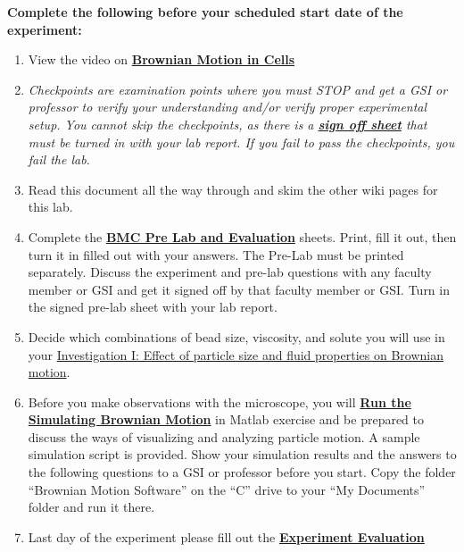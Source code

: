 \documentclass{../lab}
\begin{document}
\textbf{Complete the following before your scheduled start date of the experiment:}

\begin{enumerate}
    \item View the video on \href{http://youtu.be/XJ6YBTL6euc}{\textbf{Brownian Motion in Cells}}

    \item \emph{Checkpoints are examination points where you must STOP and get a GSI or professor to verify your understanding and/or verify proper experimental setup. You cannot skip the checkpoints, as there is a \href{http://experimentationlab.berkeley.edu/bmccheckpoints}{\textbf{sign off sheet}} that must be turned in with your lab report. If you fail to pass the checkpoints, you fail the lab.}

    \item Read this document all the way through and skim the other wiki pages for this lab.

    \item Complete the \href{http://experimentationlab.berkeley.edu/BMCPreLab}{\textbf{BMC Pre Lab and Evaluation}} sheets. Print, fill it out, then turn it in filled out with your answers. The Pre-Lab must be printed separately. Discuss the experiment and pre-lab questions with any faculty member or GSI and get it signed off by that faculty member or GSI. Turn in the signed pre-lab sheet with your lab report.

    \item Decide which combinations of bead size, viscosity, and solute you will use in your \hyperref[sec:InvestigationI]{Investigation I: Effect of particle size and fluid properties on Brownian motion}.

    \item Before you make observations with the microscope, you will \href{http://experimentationlab.berkeley.edu/node/83}{\textbf{Run the Simulating Brownian Motion}} in Matlab exercise and be prepared to discuss the ways of visualizing and analyzing particle motion.  A sample simulation script is provided. Show your simulation results and the answers to the following questions to a GSI or professor before you start. Copy the folder ``Brownian Motion Software'' on the ``C'' drive to your ``My Documents'' folder and run it there.

    \item Last day of the experiment please fill out the \href{\ExperimentEvaluation}{\textbf{Experiment Evaluation}}
\end{enumerate}
\end{document}

